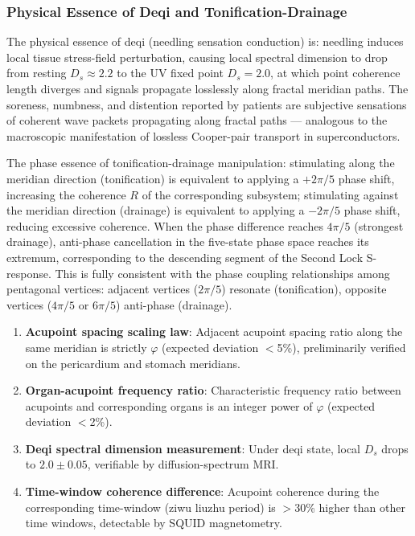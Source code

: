 \documentclass[12pt,a4paper,twocolumn]{article}
\renewcommand{\phi}{\varphi}
\begin{document}
\subsubsection{Physical Essence of Deqi and Tonification-Drainage}
\label{subsec:deqi_reinforcement}
The physical essence of deqi (needling sensation conduction) is: needling induces local tissue stress-field perturbation, causing local spectral dimension to drop from resting $D_s\approx2.2$ to the UV fixed point $D_s=2.0$, at which point coherence length diverges and signals propagate losslessly along fractal meridian paths. The soreness, numbness, and distention reported by patients are subjective sensations of coherent wave packets propagating along fractal paths --- analogous to the macroscopic manifestation of lossless Cooper-pair transport in superconductors.

The phase essence of tonification-drainage manipulation: stimulating along the meridian direction (tonification) is equivalent to applying a $+2\pi/5$ phase shift, increasing the coherence $R$ of the corresponding subsystem; stimulating against the meridian direction (drainage) is equivalent to applying a $-2\pi/5$ phase shift, reducing excessive coherence. When the phase difference reaches $4\pi/5$ (strongest drainage), anti-phase cancellation in the five-state phase space reaches its extremum, corresponding to the descending segment of the Second Lock S-response. This is fully consistent with the phase coupling relationships among pentagonal vertices: adjacent vertices ($2\pi/5$) resonate (tonification), opposite vertices ($4\pi/5$ or $6\pi/5$) anti-phase (drainage).

\begin{enumerate}
\item \textbf{Acupoint spacing scaling law}: Adjacent acupoint spacing ratio along the same meridian is strictly $\phi$ (expected deviation $<$5\%), preliminarily verified on the pericardium and stomach meridians.
\item \textbf{Organ-acupoint frequency ratio}: Characteristic frequency ratio between acupoints and corresponding organs is an integer power of $\phi$ (expected deviation $<$2\%).
\item \textbf{Deqi spectral dimension measurement}: Under deqi state, local $D_s$ drops to $2.0\pm0.05$, verifiable by diffusion-spectrum MRI.
\item \textbf{Time-window coherence difference}: Acupoint coherence during the corresponding time-window (ziwu liuzhu period) is $>$30\% higher than other time windows, detectable by SQUID magnetometry.
\end{enumerate}
\end{document}
